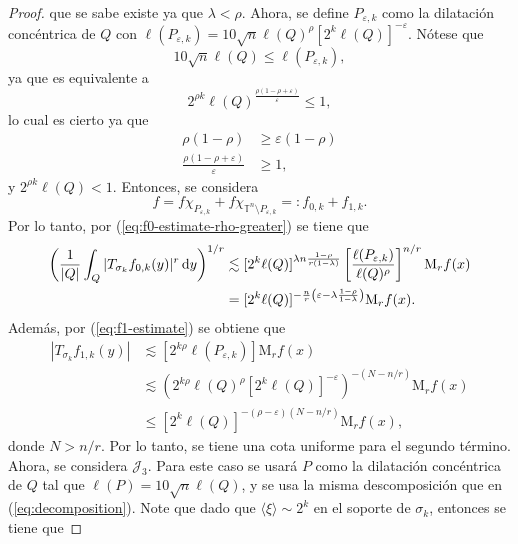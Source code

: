 \begin{proof}
que se sabe existe ya que $\lambda < \rho$. Ahora, se define $P_{\varepsilon, k}$ como la dilatación concéntrica de $Q$  con $\ell(P_{\varepsilon, k}) = 10 \sqrt{n}\ell(Q)^\rho [2^k\ell(Q)]^{-\varepsilon} $. Nótese que 
\begin{equation*}
	10\sqrt{n} \ell(Q) \leq \ell(P_{\varepsilon, k}),
\end{equation*}
ya que es equivalente a 
\begin{equation*}
	2^{\rho k} \ell(Q)^{\frac{\rho(1-\rho + \varepsilon)}{\varepsilon} } \leq 1, 
\end{equation*}
lo cual es cierto ya que 
\begin{align*}
	\rho(1-\rho) & \geq \varepsilon(1-\rho) \\
	\frac{\rho(1-\rho + \varepsilon)}{\varepsilon} & \geq 1,
\end{align*}
y $2^{\rho k}\ell(Q) < 1$. Entonces, se considera 
\begin{equation*}
	f = f\chi_{P_{\varepsilon, k}} + f\chi_{ \mathbb{T}^n\setminus P_{\varepsilon, k}} =: f_{0,k} + f_{1,k}.
\end{equation*}
Por lo tanto, por (\ref{eq:f0-estimate-rho-greater}) se tiene que 
\begin{align*}
	\left( \frac{1}{|Q|}\int_Q |T_{\sigma_k} f_{0, k}(y)|^r \mathop{}\!\mathrm{d} y 
	\right)^{1/r} & \lesssim [2^k\ell(Q)]^{\lambda n \frac{1-\rho}{r(1-\lambda)}} \left[ \frac{\ell(P_{\varepsilon, k}) }{\ell(Q)^\rho} \right]^{n/r} \mathrm{M}_rf(x)\\
	& =  [2^k\ell(Q)]^{-\frac{n}{r}\left(\varepsilon - \lambda \frac{1-\rho}{1-\lambda}\right)} \mathrm{M}_rf(x).
\end{align*}
Además, por (\ref{eq:f1-estimate}) se obtiene que
\begin{align*}
	|T_{\sigma_k}f_{1, k}(y)| & \lesssim [2^{k\rho}\ell(P_{\varepsilon,k})]\mathrm{M}_rf(x)\\
	& \lesssim\left( 2^{k\rho}\ell(Q)^\rho [2^k\ell(Q)]^{-\varepsilon} 
	\right)^{-(N-n/r)} \mathrm{M}_rf(x) \\
	& \leq [2^k\ell(Q)]^{-(\rho-\varepsilon)(N-n/r)}\mathrm{M}_rf(x),        
\end{align*}
donde $N>n/r$. Por lo tanto, se tiene una cota uniforme para el segundo término. Ahora, se considera $\mathcal{J}_3$. Para este caso se usará $P$ como la dilatación concéntrica de $Q$ tal que $\ell(P)=10\sqrt{n}\ell(Q)$, y se usa la misma descomposición que en (\ref{eq:decomposition}). Note que dado que $\langle\xi\rangle \sim 2^k$ en el soporte de $\sigma_k$, entonces se tiene que

\end{proof}
